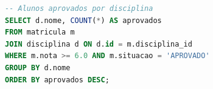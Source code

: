 \begin{codigo}[htbp]
\begin{ilustracao}[\linewidth]{\caption{O mesmo código em preto e branco (estilo \texttt{ufvcodigopb})}\label{cod:guia-pb}}{\elaboracaopropria}
  \begin{lstlisting}[language=SQL, style=ufvcodigopb]
-- Alunos aprovados por disciplina
SELECT d.nome, COUNT(*) AS aprovados
FROM matricula m
JOIN disciplina d ON d.id = m.disciplina_id
WHERE m.nota >= 6.0 AND m.situacao = 'APROVADO'
GROUP BY d.nome
ORDER BY aprovados DESC;
  \end{lstlisting}
\end{ilustracao}
\end{codigo}

